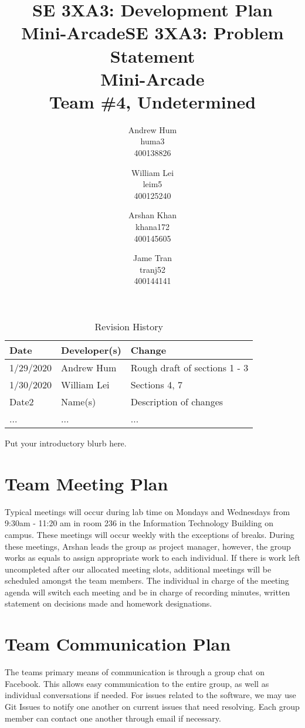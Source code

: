 \documentclass{article}
\title{SE 3XA3: Development Plan\\Mini-Arcade}
\title{SE 3XA3: Problem Statement \\ Mini-Arcade \\{\large Team \#4, Undetermined}}
\author{Andrew Hum \\ huma3 \\ 400138826 \and
		William Lei \\ leim5 \\ 400125240 \and
		Arshan Khan \\ khana172 \\ 400145605 \and
		Jame Tran \\ tranj52 \\ 400144141
}
\date{}
\begin{document}
\begin{table}[hp]
\caption{Revision History} \label{TblRevisionHistory}
\begin{tabularx}{\textwidth}{llX}
\toprule
\textbf{Date} & \textbf{Developer(s)} & \textbf{Change}\\
\midrule
1/29/2020 & Andrew Hum & Rough draft of sections 1 - 3\\
1/30/2020 & William Lei & Sections 4, 7\\
Date2 & Name(s) & Description of changes\\
... & ... & ...\\
\bottomrule
\end{tabularx}
\end{table}

\newpage

\maketitle

Put your introductory blurb here.

\section{Team Meeting Plan}

Typical meetings will occur during lab time on Mondays and Wednesdays from 9:30am - 11:20 am in room 236 in the Information Technology Building on campus. These meetings will occur weekly with the exceptions of breaks. During these meetings, Arshan leads the group as project manager, however, the group works as equals to assign appropriate work to each individual. If there is work left uncompleted after our allocated meeting slots, additional meetings will be scheduled amongst the team members. The individual in charge of the meeting agenda will switch each meeting and be in charge of recording minutes, written statement on decisions made and homework designations.

\section{Team Communication Plan}

The teams primary means of communication is through a group chat on Facebook. This allows easy communication to the entire group, as well as individual conversations if needed. For issues related to the software, we may use Git Issues to notify one another on current issues that need resolving. Each group member can contact one another through email if necessary.
\end{document}
